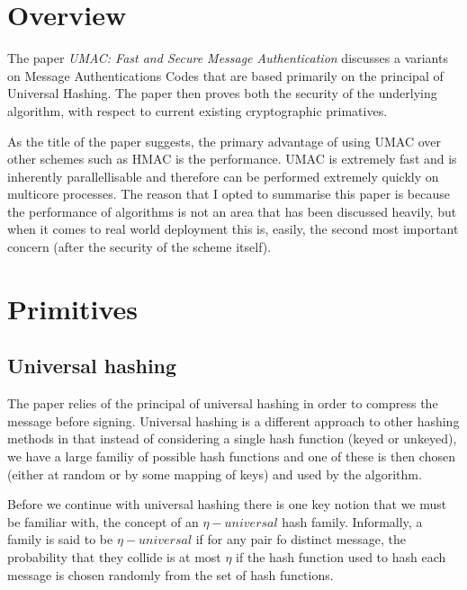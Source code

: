 
\section{Overview}

The paper \emph{UMAC: Fast and Secure Message Authentication} discusses a
variants on Message Authentications Codes that are based primarily on the
principal of Universal Hashing. The paper then proves both the security of the
underlying algorithm, with respect to current existing cryptographic
primatives.

As the title of the paper suggests, the primary advantage of using UMAC over
other schemes such as HMAC is the performance. UMAC is extremely fast and is
inherently parallellisable and therefore can be performed extremely quickly on
 multicore processes. The reason that I opted to summarise this paper is
 because the performance of algorithms is not an area that has been discussed
 heavily, but when it comes to real world deployment this is, easily, the
 second most important concern (after the security of the scheme itself).

 \section{Primitives}

 \subsection{Universal hashing}

 The paper relies of the principal of universal hashing in order to compress
 the message before signing. Universal hashing is a different approach to
 other hashing methods in that instead of considering a single hash function
 (keyed or unkeyed), we have a large familiy of possible hash functions and
 one of these is then chosen (either at random or by some mapping of keys) and
 used by the algorithm.

 Before we continue with universal hashing there is one key notion that we
 must be familiar with, the concept of an $\eta -universal$ hash family.
 Informally, a family is said to be $\eta -universal$ if for any pair fo
 distinct message, the probability that they collide is at most $\eta$ if the
 hash function used to hash each message is chosen randomly from the set of
 hash functions.


